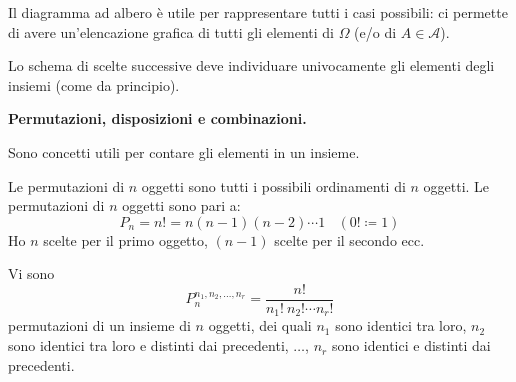 
\begin{oss}
	Il diagramma ad albero è utile per rappresentare tutti i casi possibili: ci permette di avere un'elencazione grafica di tutti gli elementi di $\Omega $ (e/o di $A\in \mathcal{A}$).
\end{oss}

\begin{oss}
	Lo schema di scelte successive deve individuare univocamente gli elementi degli insiemi (come da principio).
\end{oss}

\textbf{Permutazioni, disposizioni e combinazioni.}

Sono concetti utili per contare gli elementi in un insieme.

\begin{definition}
	Le permutazioni di $n$ oggetti sono tutti i possibili ordinamenti di $n$ oggetti. Le permutazioni di $n$ oggetti sono pari a:
	\begin{equation*}
		\boxed{P_{n} =n!=n(n-1)(n-2) \cdots 1} \ \ \ \ (0!\coloneqq 1)
	\end{equation*}
	Ho $n$ scelte per il primo oggetto, $(n-1)$ scelte per il secondo ecc.
\end{definition}

\begin{oss}
	Vi sono
	\begin{equation*}
		\boxed{P_{n}^{n_{1} ,n_{2} ,\dots ,n_{r}} =\frac{n!}{n_{1} !\ n_{2} !\cdots n_{r} !}}
	\end{equation*}
	permutazioni di un insieme di $n$ oggetti, dei quali $n_{1}$ sono identici tra loro, $n_{2}$ sono identici tra loro e distinti dai precedenti, $\dots $, $n_{r}$ sono identici e distinti dai precedenti.
\end{oss}

